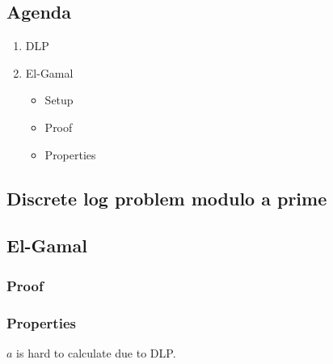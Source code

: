 

\subsection*{Agenda}
\begin{enumerate}
\item DLP
\item El-Gamal
  \begin{itemize}
  \item Setup
  \item Proof
  \item Properties
  \end{itemize}
\end{enumerate}

\subsection{Discrete log problem modulo a prime}


\subsection{El-Gamal}


\subsubsection*{Proof}


\subsubsection*{Properties}
$a$ is hard to calculate due to DLP.

